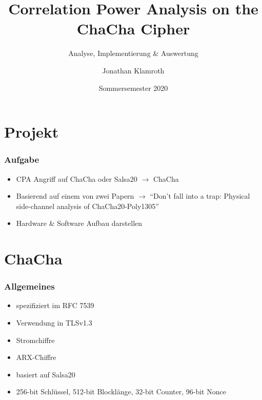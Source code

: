 \documentclass[ngerman]{beamer}
\title{Correlation Power Analysis on the ChaCha Cipher}
\subtitle{Analyse, Implementierung \& Auswertung}
\author{Jonathan Klamroth}
\date{Sommersemester 2020}
\begin{document}
\begin{frame}

    \maketitle

\end{frame}



\section{Projekt}

\begin{frame}

    \frametitle{Aufgabe}


    \begin{itemize}
        \item CPA Angriff auf ChaCha oder Salsa20 $\rightarrow$ ChaCha
        \item Basierend auf einem von zwei Papern $\rightarrow$ ``Don't fall
            into a trap: Physical side-channel analysis of ChaCha20-Poly1305''
        \item Hardware \& Software Aufbau darstellen
    \end{itemize}

\end{frame}



\section{ChaCha}

\begin{frame}

    \frametitle{Allgemeines}


    \begin{itemize}
        \item spezifiziert im RFC 7539
        \item Verwendung in TLSv1.3
        \item Stromchiffre
        \item ARX-Chiffre
        \item basiert auf Salsa20
        \item 256-bit Schlüssel, 512-bit Blocklänge, 32-bit Counter, 96-bit
            Nonce
    \end{itemize}

\end{frame}
\end{document}
